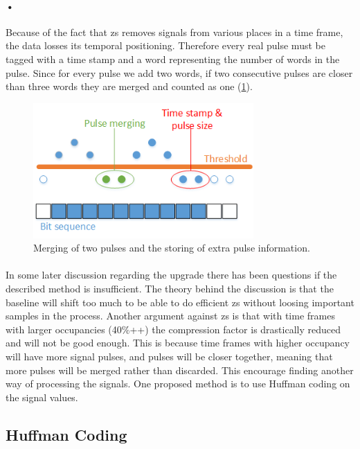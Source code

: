 \documentclass[a4paper, 12pt]{report}
\begin{document}
\paragraph{•}
Because of the fact that \gls{zs} removes signals from various places in a time frame, the data losses its temporal positioning.
Therefore every real pulse must be tagged with a time stamp and a word representing the number of words in the pulse.
Since for every pulse we add two words, if two consecutive pulses are closer than three words they are merged and counted as one (\ref{fig:merge}).

\begin{figure}[h!]
	\centering
		\includegraphics[width=0.75\textwidth]{images/merge.png}
		\caption{Merging of two pulses and the storing of extra pulse information.}
		\label{fig:merge}
\end{figure}

\paragraph{}
In some later discussion regarding the upgrade there has been questions if the described method is insufficient.
The theory behind the discussion is that the baseline will shift too much to be able to do efficient \gls{zs} without loosing important samples in the process.
Another argument against \gls{zs} is that with time frames with larger occupancies (40\%++) the compression factor is drastically reduced and will not be good enough.
This is because time frames with higher occupancy will have more signal pulses, and pulses will be closer together, meaning that more pulses will be merged rather than discarded. 
This encourage finding another way of processing the signals.
One proposed method is to use Huffman coding on the signal values.

\subsection{Huffman Coding} %
\end{document}
